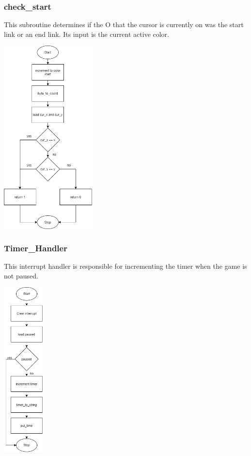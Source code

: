 \documentclass{article}
\begin{document}
    \subsubsection{check\_start}
        This subroutine determines if the O that the cursor is currently 
        on was the start link or an end link. Its input is the current
        active color.
        \begin{center}
            {\includegraphics[height=10cm]{check_start.png}\centering} 
        \end{center}
        \newpage

    \subsubsection{Timer\_Handler}
        This interrupt handler is responsible for incrementing the timer
        when the game is not paused.
        \begin{center}
            {\includegraphics[height=9cm]{Timer_Handler.png}\centering} 
        \end{center}
        \newpage   
\end{document}
